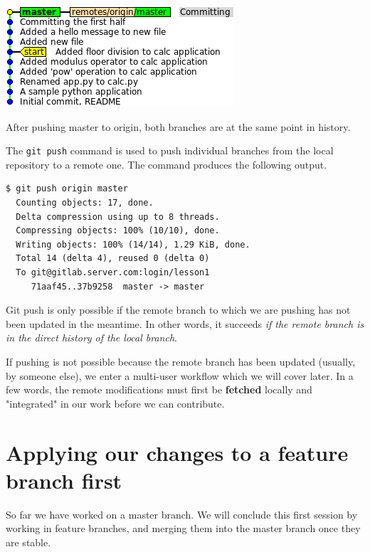 \documentclass{../../common/tufte-latex/tufte-handout}
\begin{document}
\begin{marginfigure}%
  \centering
  \includegraphics[width=\linewidth]{gitcommit-post-push.png}
  \label{fig:gitcommit-post-push}
  \caption{After pushing master to origin, both branches are at the same point in history.}
\end{marginfigure}

The \texttt{git push} command is used to push individual branches from the local repository to a remote one.
The command produces the following output.

\begin{lstlisting}[style=BashInputStyle]
  $ git push origin master 
  Counting objects: 17, done.
  Delta compression using up to 8 threads.
  Compressing objects: 100% (10/10), done.
  Writing objects: 100% (14/14), 1.29 KiB, done.
  Total 14 (delta 4), reused 0 (delta 0)
  To git@gitlab.server.com:login/lesson1
     71aaf45..37b9258  master -> master
\end{lstlisting}

Git push is only possible if the remote branch to which we are pushing has not been updated in the meantime.
In other words, it succeeds \textit{if the remote branch is in the direct history of the local branch}.

If pushing is not possible because the remote branch has been updated (usually, by someone else), we enter a multi-user workflow which we will cover later.
In a few words, the remote modifications must first be \textbf{fetched} locally and "integrated" in our work before we can contribute.

\section{Applying our changes to a feature branch first}

So far we have worked on a master branch.
We will conclude this first session by working in feature branches, and merging them into the master branch once they are stable.
\end{document}
